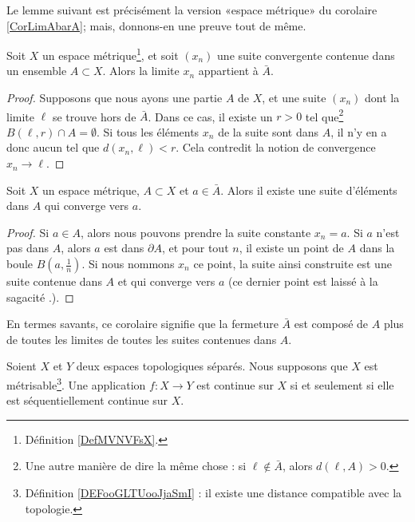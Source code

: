 Le lemme suivant est précisément la version «espace métrique» du corolaire \ref{CorLimAbarA}; mais, donnons-en une preuve tout de même.
\begin{lemma}		\label{LemLimAbarA}
	Soit \( X\) un espace métrique\footnote{Définition \ref{DefMVNVFsX}.}, et soit \( (x_n)\) une suite convergente contenue dans un ensemble \( A\subset X\). Alors la limite \( x_n\) appartient à \( \bar A\).
\end{lemma}

\begin{proof}
	Supposons que nous ayons une partie \( A\) de \( X\), et une suite \( (x_n)\) dont la limite \( \ell\) se trouve hors de \( \bar A\). Dans ce cas, il existe un \( r>0\) tel que\footnote{Une autre manière de dire la même chose : si \( \ell\notin\bar A\), alors \( d(\ell,A)>0\).} \( B(\ell,r)\cap A=\emptyset\). Si tous les éléments \( x_n\) de la suite sont dans \( A\), il n'y en a donc aucun tel que \( d(x_n,\ell)<r\). Cela contredit la notion de convergence \( x_n\to \ell\).
\end{proof}

\begin{corollary}		\label{CorAdhEstLim}
	Soit \( X\) un espace métrique, \( A \subset X\) et \( a \in \bar A\). Alors il existe une suite d'éléments dans \( A\) qui converge vers \( a\).
\end{corollary}

\begin{proof}
	Si \( a\in A\), alors nous pouvons prendre la suite constante \( x_n=a\). Si \( a\) n'est pas dans \( A\), alors \( a\) est dans \( \partial A\), et pour tout \( n\), il existe un point de \( A\) dans la boule \( B(a,\frac{1}{ n })\). Si nous nommons \( x_n\) ce point, la suite ainsi construite est une suite contenue dans \( A\) et qui converge vers \( a\) (ce dernier point est laissé à la sagacité .).
\end{proof}

En termes savants, ce corolaire signifie que la fermeture \( \bar A\) est composé de \( A\) plus de toutes les limites de toutes les suites contenues dans \( A\).

\begin{proposition}     \label{PropXIAQSXr}
	Soient \( X\) et \( Y\) deux espaces topologiques séparés. Nous supposons que \( X\) est métrisable\footnote{Définition \ref{DEFooGLTUooJjaSmI} : il existe une distance compatible avec la topologie.}. Une application \( f\colon X\to Y\) est continue sur \( X\) si et seulement si elle est séquentiellement continue sur \( X\).
\end{proposition}

